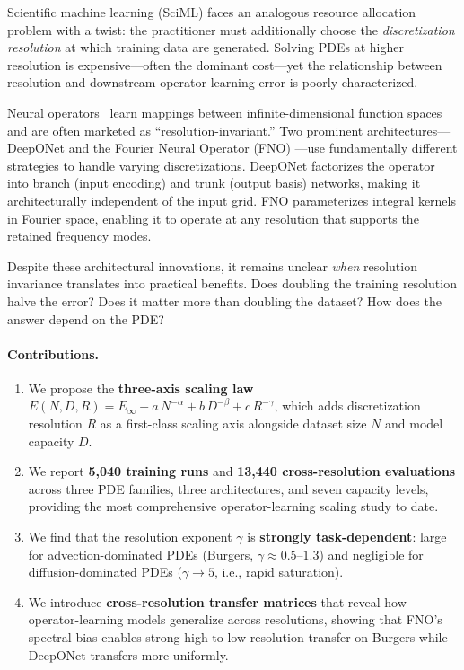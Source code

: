 \documentclass[11pt]{article}
\newcommand{\Einf}{E_\infty}
\begin{document}
Scientific machine learning (SciML) faces an analogous resource
allocation problem with a twist: the practitioner must additionally
choose the \emph{discretization resolution} at which training data are
generated. Solving PDEs at higher resolution is expensive---often the
dominant cost---yet the relationship between resolution and downstream
operator-learning error is poorly characterized.

Neural operators~\citep{lu2021learning,li2021fourier} learn mappings
between infinite-dimensional function spaces and are often marketed as
``resolution-invariant.'' Two prominent architectures---DeepONet
\citep{lu2021learning} and the Fourier Neural Operator (FNO)
\citep{li2021fourier}---use fundamentally different strategies to
handle varying discretizations. DeepONet factorizes the operator into
branch (input encoding) and trunk (output basis) networks, making it
architecturally independent of the input grid. FNO parameterizes
integral kernels in Fourier space, enabling it to operate at any
resolution that supports the retained frequency modes.

Despite these architectural innovations, it remains unclear \emph{when}
resolution invariance translates into practical benefits. Does doubling
the training resolution halve the error? Does it matter more than
doubling the dataset? How does the answer depend on the PDE?

\paragraph{Contributions.}
\begin{enumerate}
  \item We propose the \textbf{three-axis scaling law}
    $E(N,D,R) = \Einf + a\,N^{-\alpha} + b\,D^{-\beta} + c\,R^{-\gamma}$,
    which adds discretization resolution $R$ as a first-class scaling
    axis alongside dataset size $N$ and model capacity $D$.
  \item We report \textbf{5{,}040 training runs} and
    \textbf{13{,}440 cross-resolution evaluations} across three PDE
    families, three architectures, and seven capacity levels, providing
    the most comprehensive operator-learning scaling study to date.
  \item We find that the resolution exponent $\gamma$ is
    \textbf{strongly task-dependent}: large for advection-dominated PDEs
    (Burgers, $\gamma \approx 0.5$--$1.3$) and negligible for
    diffusion-dominated PDEs ($\gamma \to 5$, i.e., rapid saturation).
  \item We introduce \textbf{cross-resolution transfer matrices} that
    reveal how operator-learning models generalize across resolutions,
    showing that FNO's spectral bias enables strong high-to-low
    resolution transfer on Burgers while DeepONet transfers more
    uniformly.
\end{enumerate}
\end{document}

